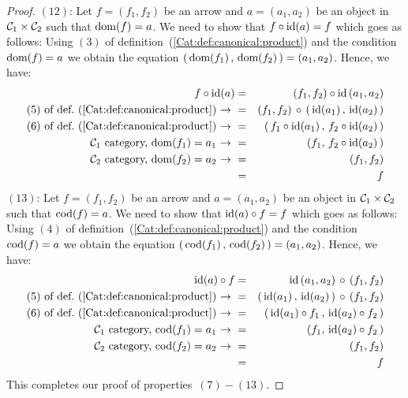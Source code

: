\begin{proof}
    $(12)$: Let $f=(f_{1},f_{2})$ be an arrow and $a=(a_{1},a_{2})$ be an 
    object in $\mbox{${\cal C}_{1}$}\times\mbox{${\cal C}_{2}$}$ such that $\mbox{\rm dom}(f)=a$. We need to show that
    $f\circ\mbox{\rm id}(a)=f$ which goes as follows: Using $(3)$ of 
    definition~(\ref{Cat:def:canonical:product}) and the condition $\mbox{\rm dom}(f)=a$ 
    we obtain the equation $(\,\mbox{\rm dom}(f_{1})\,,\,\mbox{\rm dom}(f_{2})\,)=(a_{1},a_{2})$.
    Hence, we have:
        \begin{eqnarray*}f\circ\id(a)
            &=&(f_{1},f_{2})\circ\id\,(a_{1},a_{2})\\
            \mbox{$(5)$ of def.~(\ref{Cat:def:canonical:product})\ $\to$\ }
            &=&(f_{1},f_{2})\,\circ\,(\,\id(a_{1})\,,\,\id(a_{2})\,)\\
            \mbox{$(6)$ of def.~(\ref{Cat:def:canonical:product})\ $\to$\ }
            &=&(\,f_{1}\circ\id(a_{1})\,,\,f_{2}\circ\id(a_{2})\,)\\
            \mbox{\Cone\ category, $\dom(f_{1})=a_{1}$\ $\to$\ }
            &=&(f_{1},\,f_{2}\circ\id(a_{2})\,)\\
            \mbox{\Ctwo\ category, $\dom(f_{2})=a_{2}$\ $\to$\ }
            &=&(f_{1},f_{2})\\
            &=&f
        \end{eqnarray*}
    $(13)$: Let $f=(f_{1},f_{2})$ be an arrow and $a=(a_{1},a_{2})$ be an 
    object in $\mbox{${\cal C}_{1}$}\times\mbox{${\cal C}_{2}$}$ such that $\mbox{\rm cod}(f)=a$. We need to show that
    $\mbox{\rm id}(a)\circ f=f$ which goes as follows: Using $(4)$ of 
    definition~(\ref{Cat:def:canonical:product}) and the condition $\mbox{\rm cod}(f)=a$ 
    we obtain the equation $(\,\mbox{\rm cod}(f_{1})\,,\,\mbox{\rm cod}(f_{2})\,)=(a_{1},a_{2})$.
    Hence, we have:
        \begin{eqnarray*}\id(a)\circ f
            &=&\id\,(a_{1},a_{2})\,\circ\,(f_{1},f_{2})\\
            \mbox{$(5)$ of def.~(\ref{Cat:def:canonical:product})\ $\to$\ }
            &=&(\,\id(a_{1})\,,\,\id(a_{2})\,)\,\circ\,(f_{1},f_{2})\\
            \mbox{$(6)$ of def.~(\ref{Cat:def:canonical:product})\ $\to$\ }
            &=&(\,\id(a_{1})\circ f_{1}\,,\,\id(a_{2})\circ f_{2}\,)\\
            \mbox{\Cone\ category, $\cod(f_{1})=a_{1}$\ $\to$\ }
            &=&(f_{1},\,\id(a_{2})\circ f_{2}\,)\\
            \mbox{\Ctwo\ category, $\cod(f_{2})=a_{2}$\ $\to$\ }
            &=&(f_{1},f_{2})\\
            &=&f
        \end{eqnarray*}
This completes our proof of properties~$(7)-(13)$.
\end{proof}
